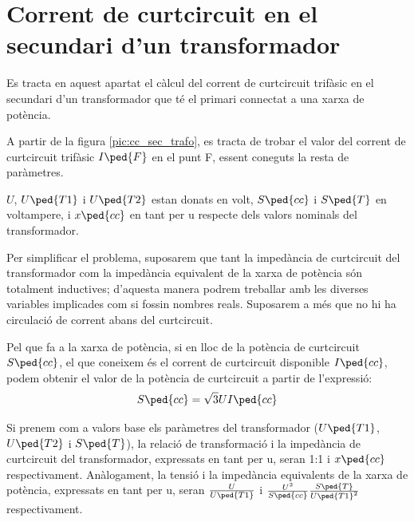 \section{Corrent de curtcircuit en el  secundari d'un transformador}
\label{sec:cc-sec-trafo}

 Es tracta en aquest apartat el càlcul del corrent de curtcircuit trifàsic en el secundari d'un transformador que té el
primari connectat  a una xarxa de potència.

A partir de la figura \vref{pic:cc_sec_trafo}, es tracta de trobar
el valor del corrent de curtcircuit trifàsic $I\ped{F}$ en el punt
F, essent coneguts la resta de paràmetres.

\begin{center}
    
     \label{pic:cc_sec_trafo}
\end{center}

$U$, $U\ped{T1}$ i $U\ped{T2}$ estan donats en volt,
$S\ped{cc}$ i $S\ped{T}$ en voltampere, i $x\ped{cc}$ en tant per u
respecte dels valors nominals del transformador.


Per simplificar el problema, suposarem que tant la impedància
de curtcircuit del transformador com la impedància equivalent de
la xarxa de potència són totalment inductives; d'aquesta manera
podrem treballar amb les diverses variables implicades com si
fossin nombres reals. Suposarem a més que no hi ha circulació de
corrent abans del curtcircuit.

Pel que fa a la xarxa de potència, si en lloc de la potència de curtcircuit $S\ped{cc}$, el que coneixem és el corrent de curtcircuit
disponible $I\ped{cc}$, podem obtenir el valor de la potència de
curtcircuit a partir de l'expressió:
\begin{equation}
    S\ped{cc} = \sqrt{3} U I\ped{cc}
\end{equation}

 Si prenem com a valors base els
paràmetres del transformador ($U\ped{T1}$, $U\ped{T2}$ i
$S\ped{T}$), la relació de transformació i la impedància de curtcircuit del transformador, expressats en tant per u, seran 1:1 i
$x\ped{cc}$ respectivament. Anàlogament, la tensió i la impedància
equivalents de la xarxa de potència, expressats en tant per u, seran
$\frac{U}{U\ped{T1}}$ i $\frac{U^2}{S\ped{cc}}
\frac{S\ped{T}}{U\ped{T1}^2}$ respectivament.

